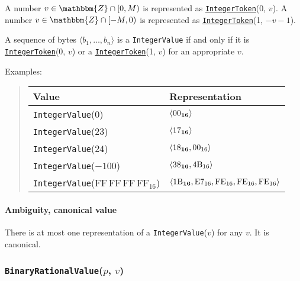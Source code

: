 \documentclass{dbor-article}
\newcommand{\SetOfIntegers}{\mathbbm{Z}}
\newcommand{\HexNumber}[1]{\mathrm{#1}_{16}}
\newcommand{\DborSyntaxIdent}[1]{\texttt{#1}}
\newcommand{\DborSyntaxIdentRef}[1]{\hyperlink{sec:def:#1}{\DborSyntaxIdent{#1}}}
\newcommand{\DborFirstByte}[2]{\mathbf{\textcolor{#1}{\HexNumber{#2}}}}
\newcommand{\DborFirstByteNumber}[1]{\DborFirstByte{black}{#1}}
\newcommand{\DborNextByte}[1]{\HexNumber{#1}}
\begin{document}
    A number $v \in \SetOfIntegers \cap [0, M)$ is represented as \DborSyntaxIdentRef{IntegerToken}(0, $v$).
    A number $v \in \SetOfIntegers \cap [-M, 0)$ is represented as \DborSyntaxIdentRef{IntegerToken}(1, $-v - 1$).

    A sequence of bytes $\langle b_1, \ldots, b_n\rangle$ is a \DborSyntaxIdent{IntegerValue} if and only if
    it is \DborSyntaxIdentRef{IntegerToken}(0, $v$) or a \DborSyntaxIdentRef{IntegerToken}(1, $v$) for an
    appropriate $v$.

    \smallskip
    \noindent
    Examples:
    \nolinebreak
    \begin{quote}    
        \begin{tabular}{ll}
            \toprule
            Value & Representation \\
            \midrule
            \DborSyntaxIdent{IntegerValue}($0$)    
                &  $\langle \DborFirstByteNumber{00} \rangle$ \\
            \DborSyntaxIdent{IntegerValue}($23$)
                &  $\langle \DborFirstByteNumber{17} \rangle$ \\
            \DborSyntaxIdent{IntegerValue}($24$)
                &  $\langle \DborFirstByteNumber{18}, \DborNextByte{00} \rangle$ \\
            \DborSyntaxIdent{IntegerValue}($-100$) 
                &  $\langle \DborFirstByteNumber{38}, \DborNextByte{4B} \rangle$ \\
            \DborSyntaxIdent{IntegerValue}($\HexNumber{FF\,FF\,FF\,FF}$) 
                &  $\langle \DborFirstByteNumber{1B}, \DborNextByte{E7}, \DborNextByte{FE},
                   \DborNextByte{FE}, \DborNextByte{FE} \rangle$ \\
            \bottomrule
        \end{tabular}
    \end{quote}

    \paragraph{Ambiguity, canonical value}

    There is at most one representation of a \DborSyntaxIdent{IntegerValue}($v$) for any $v$.
    It is canonical.


    \subsubsection{\DborSyntaxIdent{BinaryRationalValue}($p$, $v$)}
    \hypertarget{sec:def:BinaryRationalValue}{}
\end{document}
